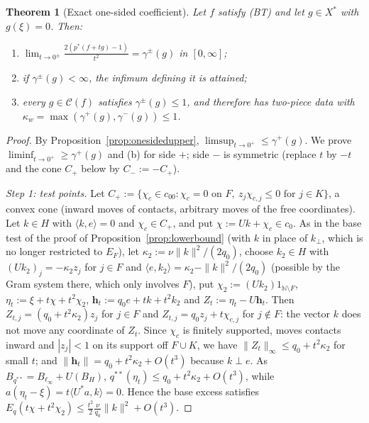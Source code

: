 \documentclass[10pt]{amsart}
\newtheorem{theorem}{Theorem}[section]
\theoremstyle{definition}
\theoremstyle{remark}
\newcommand{\N}{\mathbb N}
\newcommand{\Cset}{\mathcal C}
\newcommand{\ip}[2]{\langle #1,#2\rangle}
\begin{document}
\begin{theorem}[Exact one-sided coefficient]\label{thm:onesided}
Let $f$ satisfy \textup{(BT)} and let $g\in X^*$ with $g(\xi)=0$.  Then:
\begin{enumerate}
\item[(a)] $\displaystyle\lim_{t\to0^\pm}\frac{2(p^*(f+tg)-1)}{t^2}=
\gamma^\pm(g)$ in $[0,\infty]$;
\item[(b)] if $\gamma^\pm(g)<\infty$, the infimum defining it is attained;
\item[(c)] every $g\in\Cset(f)$ satisfies $\gamma^\pm(g)\le1$, and therefore
has two-piece data with $\kappa_w=\max(\gamma^+(g),\gamma^-(g))\le1$.
\end{enumerate}
\end{theorem}

\begin{proof}
By Proposition~\ref{prop:onesidedupper}, $\limsup_{t\to0^+}\le\gamma^+(g)$.
We prove $\liminf_{t\to0^+}\ge\gamma^+(g)$ and (b) for side $+$; side $-$
is symmetric (replace $t$ by $-t$ and the cone $C_+$ below by
$C_-:=-C_+$).

\emph{Step 1: test points.}  Let
$C_+:=\{\chi_c\in c_{00}:\chi_c=0\text{ on }F,\ z_j\chi_{c,j}\le0\text{ for }
j\in K\}$, a convex cone (inward moves of contacts, arbitrary moves of the
free coordinates).  Let $k\in H$ with $\ip ke=0$ and $\chi_c\in C_+$, and put
$\chi:=Uk+\chi_c\in c_0$.  As in the base test of the proof of
Proposition~\ref{prop:lowerbound} (with $k$ in place of $k_\perp$, which is
no longer restricted to $E_F$), let $\kappa_2:=\nu\|k\|^2/(2q_0)$, choose
$k_2\in H$ with $(Uk_2)_j=-\kappa_2z_j$ for $j\in F$ and
$\ip{e}{k_2}=\kappa_2-\|k\|^2/(2q_0)$ (possible by the Gram system there,
which only involves $F$), put $\chi_2:=(Uk_2)1_{\N\setminus F}$,
$\eta_t:=\xi+t\chi+t^2\chi_2$, $\mathbf h_t:=q_0e+tk+t^2k_2$ and
$Z_t:=\eta_t-U\mathbf h_t$.  Then $Z_{t,j}=(q_0+t^2\kappa_2)z_j$ for $j\in F$
and $Z_{t,j}=q_0z_j+t\chi_{c,j}$ for $j\notin F$: the vector $k$ does not
move any coordinate of $Z_t$.  Since $\chi_c$ is finitely supported, moves
contacts inward and $|z_j|<1$ on its support off $F\cup K$, we have
$\|Z_t\|_\infty\le q_0+t^2\kappa_2$ for small $t$; and $\|\mathbf h_t\|=
q_0+t^2\kappa_2+O(t^3)$ because $k\perp e$.  As
$B_{q^{**}}=B_{\ell_\infty}+U(B_H)$, $q^{**}(\eta_t)\le q_0+t^2\kappa_2+
O(t^3)$, while $a(\eta_t-\xi)=t\ip{U^*a}{k}=0$.  Hence the base excess
satisfies $E_q(t\chi+t^2\chi_2)\le\frac{t^2}2\frac\nu{q_0}\|k\|^2+O(t^3)$.


\end{proof}
\end{document}
